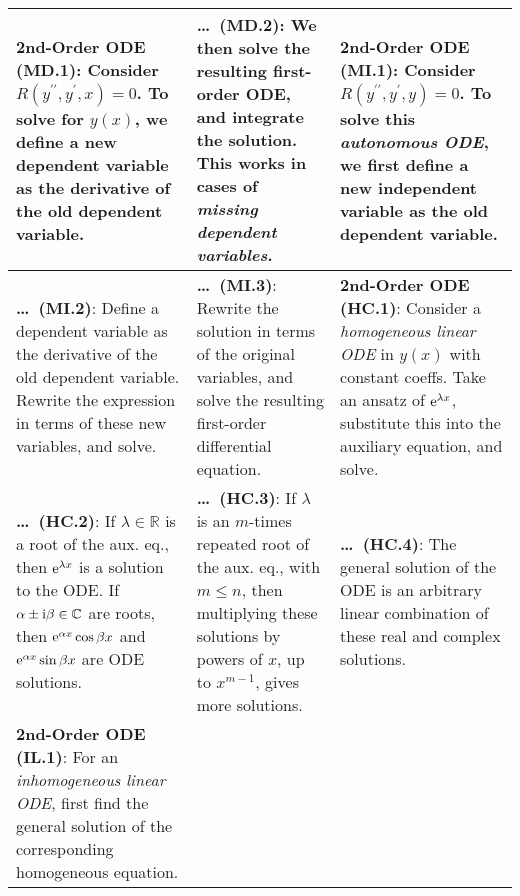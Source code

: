 \begin{tabular}{|m{.31\linewidth}|m{.31\linewidth}|m{.31\linewidth}|}
\hline

\textbf{2nd-Order ODE (MD.1)}:
    Consider $ R(y^{\prime\prime}, y^\prime, x) = 0 $. To solve for $ y(x) $, we
    define a new dependent variable as the derivative of the old dependent
    variable. &

\textbf{\ldots\ (MD.2)}:
    We then solve the resulting first-order ODE, and integrate the solution.
    This works in cases of \emph{missing dependent variables}. &

\textbf{2nd-Order ODE (MI.1)}:
    Consider $ R(y^{\prime\prime}, y^\prime, y) = 0$. To solve this
    \emph{autonomous ODE}, we first define a new independent variable as the old
    dependent variable. \\

\hline

\textbf{\ldots\ (MI.2)}:
    Define a dependent variable as the derivative of the old dependent variable.
    Rewrite the expression in terms of these new variables, and solve. &

\textbf{\ldots\ (MI.3)}:
    Rewrite the solution in terms of the original variables, and solve the
    resulting first-order differential equation. &

\textbf{2nd-Order ODE (HC.1)}:
    Consider a \emph{homogeneous linear ODE} in $ y(x) $ with constant coeffs.
    Take an ansatz of $ \mathrm{e}^{\lambda x} $, substitute this into the
    auxiliary equation, and solve. \\

\hline

\textbf{\ldots\ (HC.2)}:
    If
        $ \lambda \in \mathbb{R} $ is a root of the aux. eq.,
    then
        $ \mathrm{e}^{\lambda x} $ is a solution to the ODE.
    If
        $ \alpha \pm \mathrm{i} \beta \in \mathbb{C} $ are roots,
    then
        $ \mathrm{e}^{\alpha x} \cos \beta x $ and
        $ \mathrm{e}^{\alpha x} \sin \beta x $
        are ODE solutions. &

\textbf{\ldots\ (HC.3)}:
    If $ \lambda $ is an $m$-times repeated root of the aux. eq., with
    $ m \leq n $, then multiplying these solutions by powers of $ x $, up to
    $ x^{m - 1} $, gives more solutions. &

\textbf{\ldots\ (HC.4)}:
    The general solution of the ODE is an arbitrary linear combination of these
    real and complex solutions. \\

\hline

\textbf{2nd-Order ODE (IL.1)}:
    For an \emph{inhomogeneous linear ODE}, first find the general solution of
    the corresponding homogeneous equation. &


\end{tabular}
